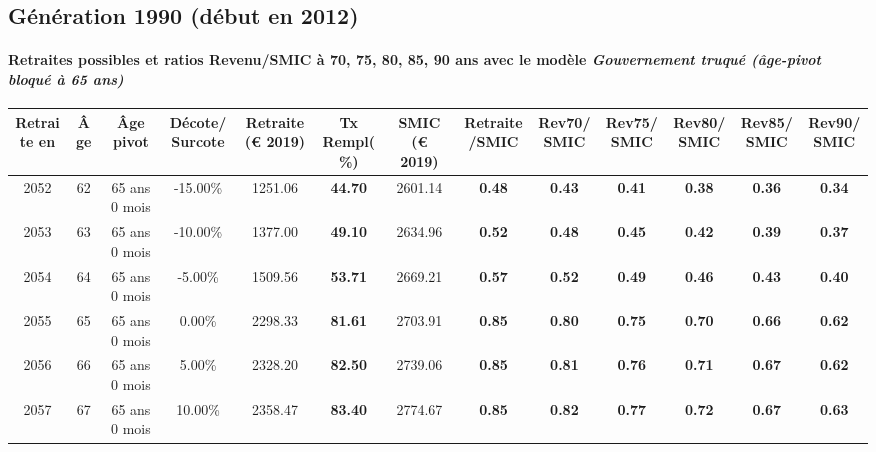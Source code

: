 \newpage 
 
\subsection{Génération 1990 (début en 2012)} 

\paragraph{Retraites possibles et ratios Revenu/SMIC à 70, 75, 80, 85, 90 ans avec le modèle \emph{Gouvernement truqué (âge-pivot bloqué à 65 ans)}}  
 
{ \scriptsize \begin{center} 
\begin{tabular}[htb]{|c|c||c|c||c|c||c||c|c|c|c|c|c|} 
\hline 
 Retraite en &  Âge &  Âge pivot &  Décote/Surcote &  Retraite (\euro{} 2019) &  Tx Rempl(\%) &  SMIC (\euro{} 2019) &  Retraite/SMIC &  Rev70/SMIC &  Rev75/SMIC &  Rev80/SMIC &  Rev85/SMIC &  Rev90/SMIC \\ 
\hline \hline 
 2052 &  62 &  65 ans 0 mois &  -15.00\% &  1251.06 &  {\bf 44.70} &  2601.14 &  {\bf {\color{red} 0.48}} &  {\bf {\color{red} 0.43}} &  {\bf {\color{red} 0.41}} &  {\bf {\color{red} 0.38}} &  {\bf {\color{red} 0.36}} &  {\bf {\color{red} 0.34}} \\ 
\hline 
 2053 &  63 &  65 ans 0 mois &  -10.00\% &  1377.00 &  {\bf 49.10} &  2634.96 &  {\bf {\color{red} 0.52}} &  {\bf {\color{red} 0.48}} &  {\bf {\color{red} 0.45}} &  {\bf {\color{red} 0.42}} &  {\bf {\color{red} 0.39}} &  {\bf {\color{red} 0.37}} \\ 
\hline 
 2054 &  64 &  65 ans 0 mois &  -5.00\% &  1509.56 &  {\bf 53.71} &  2669.21 &  {\bf {\color{red} 0.57}} &  {\bf {\color{red} 0.52}} &  {\bf {\color{red} 0.49}} &  {\bf {\color{red} 0.46}} &  {\bf {\color{red} 0.43}} &  {\bf {\color{red} 0.40}} \\ 
\hline 
 2055 &  65 &  65 ans 0 mois &  0.00\% &  2298.33 &  {\bf 81.61} &  2703.91 &  {\bf {\color{red} 0.85}} &  {\bf {\color{red} 0.80}} &  {\bf {\color{red} 0.75}} &  {\bf {\color{red} 0.70}} &  {\bf {\color{red} 0.66}} &  {\bf {\color{red} 0.62}} \\ 
\hline 
 2056 &  66 &  65 ans 0 mois &  5.00\% &  2328.20 &  {\bf 82.50} &  2739.06 &  {\bf {\color{red} 0.85}} &  {\bf {\color{red} 0.81}} &  {\bf {\color{red} 0.76}} &  {\bf {\color{red} 0.71}} &  {\bf {\color{red} 0.67}} &  {\bf {\color{red} 0.62}} \\ 
\hline 
 2057 &  67 &  65 ans 0 mois &  10.00\% &  2358.47 &  {\bf 83.40} &  2774.67 &  {\bf {\color{red} 0.85}} &  {\bf {\color{red} 0.82}} &  {\bf {\color{red} 0.77}} &  {\bf {\color{red} 0.72}} &  {\bf {\color{red} 0.67}} &  {\bf {\color{red} 0.63}} \\ 
\hline 
\hline 
\end{tabular} 
\end{center} } 
